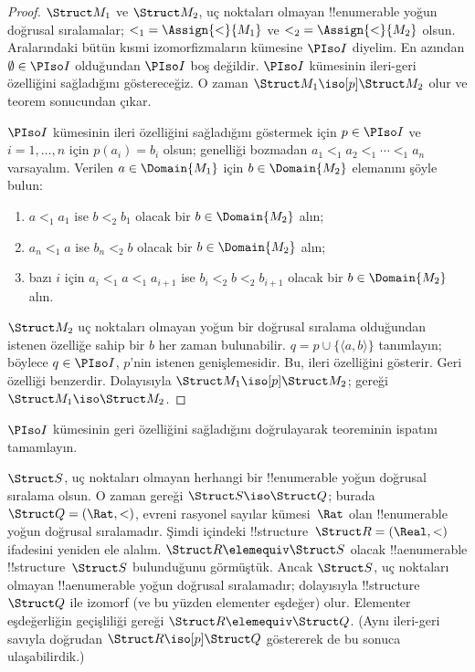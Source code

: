 \begin{proof}
  $\Struct M_1$ ve $\Struct M_2$, uç noktaları olmayan !!{enumerable}
  yoğun doğrusal sıralamalar; ${<_1}=\Assign{<}{M_1}$ ve
  ${<_2}=\Assign{<}{M_2}$ olsun. Aralarındaki bütün kısmi
  izomorfizmaların kümesine $\PIso I$ diyelim. En azından
  $\emptyset\in\PIso I$ olduğundan $\PIso I$ boş değildir. $\PIso I$
  kümesinin ileri-geri özelliğini sağladığını göstereceğiz. O zaman
  $\Struct M_1\iso[p]\Struct M_2$ olur ve teorem
   sonucundan çıkar.

  $\PIso I$ kümesinin ileri özelliğini sağladığını göstermek için
  $p\in\PIso I$ ve $i=1,\dots,n$ için $p(a_i)=b_i$ olsun; genelliği
  bozmadan $a_1<_1a_2<_1\cdots<_1a_n$ varsayalım. Verilen
  $a\in\Domain{M_1}$ için $b\in\Domain{M_2}$ elemanını şöyle bulun:
  \begin{enumerate}
  \item $a<_1a_1$ ise $b<_2b_1$ olacak bir $b\in\Domain{M_2}$ alın;
  \item $a_n<_1a$ ise $b_n<_2b$ olacak bir $b\in\Domain{M_2}$ alın;
  \item bazı $i$ için $a_i<_1a<_1a_{i+1}$ ise
    $b_i<_2b<_2b_{i+1}$ olacak bir $b\in\Domain{M_2}$ alın.
  \end{enumerate}
  $\Struct M_2$ uç noktaları olmayan yoğun bir doğrusal sıralama
  olduğundan istenen özelliğe sahip bir $b$ her zaman bulunabilir.
  $q=p\cup\{\langle a,b\rangle\}$ tanımlayın; böylece $q\in\PIso I$,
  $p$'nin istenen genişlemesidir. Bu, ileri özelliğini gösterir. Geri
  özelliği benzerdir. Dolayısıyla $\Struct M_1\iso[p]\Struct M_2$;
   gereği $\Struct M_1\iso\Struct M_2$.
\end{proof}

\begin{prob}
  $\PIso I$ kümesinin geri özelliğini sağladığını doğrulayarak
   teoreminin ispatını tamamlayın.
\end{prob}

\begin{rem}
  $\Struct S$, uç noktaları olmayan herhangi bir !!{enumerable} yoğun
  doğrusal sıralama olsun. O zaman  gereği
  $\Struct S\iso\Struct Q$; burada $\Struct Q=(\Rat,<)$, evreni
  rasyonel sayılar kümesi~$\Rat$ olan !!{enumerable} yoğun doğrusal
  sıralamadır. Şimdi  içindeki
  !!{structure}~$\Struct R=(\Real,<)$ ifadesini yeniden ele alalım.
  $\Struct R\elemequiv\Struct S$ olacak !!a{enumerable}
  !!{structure}~$\Struct S$ bulunduğunu görmüştük. Ancak $\Struct S$,
  uç noktaları olmayan !!a{enumerable} yoğun doğrusal sıralamadır;
  dolayısıyla !!{structure}~$\Struct Q$ ile izomorf (ve bu yüzden
  elementer eşdeğer) olur. Elementer eşdeğerliğin geçişliliği gereği
  $\Struct R\elemequiv\Struct Q$. (Aynı ileri-geri savıyla doğrudan
  $\Struct R\iso[p]\Struct Q$ göstererek de bu sonuca ulaşabilirdik.)
\end{rem}
